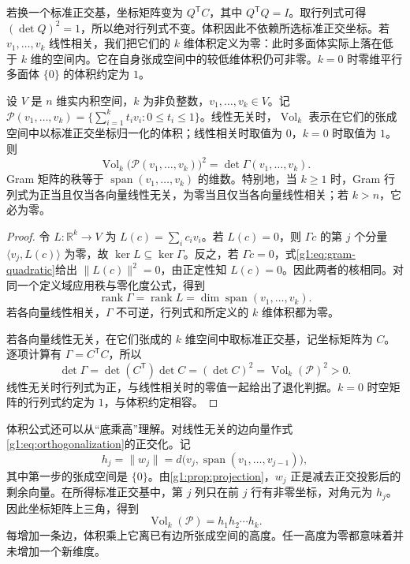 \ProseParagraphBreak

若换一个标准正交基，坐标矩阵变为 \(Q^{\mathsf T}C\)，其中 \(Q^{\mathsf T}Q=I\)。取行列式可得 \((\det Q)^2=1\)，所以绝对行列式不变。体积因此不依赖所选标准正交坐标。若 \(v_1,\ldots,v_k\) 线性相关，我们把它们的 \(k\) 维体积定义为零：此时多面体实际上落在低于 \(k\) 维的空间内。它在自身张成空间中的较低维体积仍可非零。\(k=0\) 时零维平行多面体 \(\{0\}\) 的体积约定为 \(1\)。

\begin{proposition}
	\label{g1:prop:gram-volume}
	设 \(V\) 是 \(n\) 维实内积空间，\(k\) 为非负整数，\(v_1,\ldots,v_k\in V\)。记 \(\mathcal P(v_1,\ldots,v_k)=\{\sum_{i=1}^k t_iv_i:0\le t_i\le1\}\)。线性无关时，\(\operatorname{Vol}_k\) 表示在它们的张成空间中以标准正交坐标归一化的体积；线性相关时取值为 \(0\)，\(k=0\) 时取值为 \(1\)。则
	\[
		\operatorname{Vol}_k\bigl(\mathcal P(v_1,\ldots,v_k)\bigr)^2
		=\det\Gamma(v_1,\ldots,v_k).
	\]
	Gram 矩阵的秩等于 \(\operatorname{span}(v_1,\ldots,v_k)\) 的维数。特别地，当 \(k\geq1\) 时，Gram 行列式为正当且仅当各向量线性无关，为零当且仅当各向量线性相关；若 \(k>n\)，它必为零。
\end{proposition}

\begin{proof}
	令 \(L\colon\mathbb R^k\rightarrow V\) 为 \(L(c)=\sum_i c_iv_i\)。若 \(L(c)=0\)，则 \(\Gamma c\) 的第 \(j\) 个分量 \(\langle v_j,L(c)\rangle\) 为零，故 \(\ker L\subseteq\ker\Gamma\)。反之，若 \(\Gamma c=0\)，式\eqref{g1:eq:gram-quadratic}给出 \(\lVert L(c)\rVert^2=0\)，由正定性知 \(L(c)=0\)。因此两者的核相同。对同一个定义域应用秩与零化度公式，得到
	\[
		\operatorname{rank}\Gamma=\operatorname{rank}L
		=\dim\operatorname{span}(v_1,\ldots,v_k).
	\]
	若各向量线性相关，\(\Gamma\) 不可逆，行列式和所定义的 \(k\) 维体积都为零。

	若各向量线性无关，在它们张成的 \(k\) 维空间中取标准正交基，记坐标矩阵为 \(C\)。逐项计算有 \(\Gamma=C^{\mathsf T}C\)，所以
	\[
		\det\Gamma=\det(C^{\mathsf T})\det C=(\det C)^2
		=\operatorname{Vol}_k(\mathcal P)^2>0.
	\]
	线性无关时行列式为正，与线性相关时的零值一起给出了退化判据。\(k=0\) 时空矩阵的行列式约定为 \(1\)，与体积约定相容。
\end{proof}

体积公式还可以从“底乘高”理解。对线性无关的边向量作式\eqref{g1:eq:orthogonalization}的正交化。记
\[
	h_j=\lVert w_j\rVert
	=d\bigl(v_j,\operatorname{span}(v_1,\ldots,v_{j-1})\bigr),
\]
其中第一步的张成空间是 \(\{0\}\)。由\cref{g1:prop:projection}，\(w_j\) 正是减去正交投影后的剩余向量。在所得标准正交基中，第 \(j\) 列只在前 \(j\) 行有非零坐标，对角元为 \(h_j\)。因此坐标矩阵上三角，得到
\[
	\operatorname{Vol}_k(\mathcal P)=h_1h_2\cdots h_k.
\]
每增加一条边，体积乘上它离已有边所张成空间的高度。任一高度为零都意味着并未增加一个新维度。

